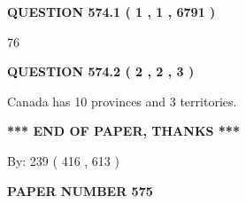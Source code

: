 \documentclass[12pt]{article}
\begin{document}
 
 
 
   
   
  
\vspace{0.2in}
  
{\textbf{\Large{QUESTION
574.1 
 ( 1 , 1 , 6791 )
}}}
  
  
 
 
\noindent{}

76
 
 
  
\vspace{0.2in}
  
{\textbf{\Large{QUESTION
574.2 
 ( 2 , 2 , 3 )
}}}
  
  
 
 
\noindent{}
 
 
Canada has 10  provinces and 3 territories.
 
 
 
 
   
   
 \vspace{0.2in}
 
   
   
   
   
\vspace{1.0in} 
{\textbf{\large{ *** END OF PAPER, THANKS *** }}} 
   
   
\hspace{1.0in} By: 
 239 ( 416 ,  613 )
   
   
   
   
\newpage 
\setcounter{page}{ 
   575001 } 
   
   
   
   
 {\textbf{ \Large{ PAPER NUMBER  575  }}}
   
   
\vspace{0.2in}
   
   
   
   
   
   
 \vspace{0.2in}
 
 
 
 
   
   
  
\vspace{0.2in}
  
\end{document}
